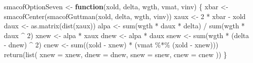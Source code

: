 \documentclass[
  12pt,
  letterpaper,
  DIV=11,
  numbers=noendperiod]{scrartcl}
\newenvironment{Shaded}{\begin{snugshade}}{\end{snugshade}}
\newcommand{\AttributeTok}[1]{\textcolor[rgb]{0.40,0.45,0.13}{#1}}
\newcommand{\ControlFlowTok}[1]{\textcolor[rgb]{0.00,0.23,0.31}{\textbf{#1}}}
\newcommand{\DecValTok}[1]{\textcolor[rgb]{0.68,0.00,0.00}{#1}}
\newcommand{\FunctionTok}[1]{\textcolor[rgb]{0.28,0.35,0.67}{#1}}
\newcommand{\NormalTok}[1]{\textcolor[rgb]{0.00,0.23,0.31}{#1}}
\newcommand{\OtherTok}[1]{\textcolor[rgb]{0.00,0.23,0.31}{#1}}
\newcommand{\SpecialCharTok}[1]{\textcolor[rgb]{0.37,0.37,0.37}{#1}}
\begin{document}
\begin{Shaded}
\begin{Highlighting}[]
\NormalTok{smacofOptionSeven }\OtherTok{\textless{}{-}} \ControlFlowTok{function}\NormalTok{(xold, delta, wgth, vmat, vinv) \{}
\NormalTok{  xbar }\OtherTok{\textless{}{-}} \FunctionTok{smacofCenter}\NormalTok{(}\FunctionTok{smacofGuttman}\NormalTok{(xold, delta, wgth, vinv))}
\NormalTok{  xaux }\OtherTok{\textless{}{-}} \DecValTok{2} \SpecialCharTok{*}\NormalTok{ xbar }\SpecialCharTok{{-}}\NormalTok{ xold}
\NormalTok{  daux }\OtherTok{\textless{}{-}} \FunctionTok{as.matrix}\NormalTok{(}\FunctionTok{dist}\NormalTok{(xaux))}
\NormalTok{  alpa }\OtherTok{\textless{}{-}} \FunctionTok{sum}\NormalTok{(wgth }\SpecialCharTok{*}\NormalTok{ daux }\SpecialCharTok{*}\NormalTok{ delta) }\SpecialCharTok{/} \FunctionTok{sum}\NormalTok{(wgth }\SpecialCharTok{*}\NormalTok{ daux }\SpecialCharTok{\^{}} \DecValTok{2}\NormalTok{)}
\NormalTok{  xnew }\OtherTok{\textless{}{-}}\NormalTok{ alpa }\SpecialCharTok{*}\NormalTok{ xaux}
\NormalTok{  dnew }\OtherTok{\textless{}{-}}\NormalTok{ alpa }\SpecialCharTok{*}\NormalTok{ daux}
\NormalTok{  snew }\OtherTok{\textless{}{-}} \FunctionTok{sum}\NormalTok{(wgth }\SpecialCharTok{*}\NormalTok{ (delta }\SpecialCharTok{{-}}\NormalTok{ dnew) }\SpecialCharTok{\^{}} \DecValTok{2}\NormalTok{)}
\NormalTok{  cnew }\OtherTok{\textless{}{-}} \FunctionTok{sum}\NormalTok{((xold }\SpecialCharTok{{-}}\NormalTok{ xnew) }\SpecialCharTok{*}\NormalTok{ (vmat }\SpecialCharTok{\%*\%}\NormalTok{ (xold }\SpecialCharTok{{-}}\NormalTok{ xnew)))}
  \FunctionTok{return}\NormalTok{(}\FunctionTok{list}\NormalTok{(}
    \AttributeTok{xnew =}\NormalTok{ xnew,}
    \AttributeTok{dnew =}\NormalTok{ dnew,}
    \AttributeTok{snew =}\NormalTok{ snew,}
    \AttributeTok{cnew =}\NormalTok{ cnew}
\NormalTok{  ))}
\NormalTok{\}}


\end{Highlighting}
\end{Shaded}
\end{document}
